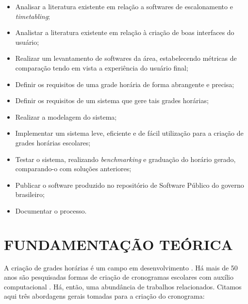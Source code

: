 \documentclass[12pt,a4paper]{article}
\begin{document}
			\begin{itemize}
				\item Analisar a literatura existente em relação a softwares de escalonamento e \textit{timetabling};
				\item Analistar a literatura existente em relação à criação de boas interfaces do usuário;
				\item Realizar um levantamento de softwares da área, estabelecendo métricas de comparação tendo em vista a experiência do usuário final;
				\item Definir os requisitos de uma grade horária de forma abrangente e precisa;
				\item Definir os requisitos de um sistema que gere tais grades horárias;
				\item Realizar a modelagem do sistema;
				\item Implementar um sistema leve, eficiente e de fácil utilização para a criação de grades horárias escolares;
				\item Testar o sistema, realizando \textit{benchmarking} e graduação do horário gerado, com\-pa\-ran\-do-o com soluções anteriores;
				\item Publicar o software produzido no repositório de Software Público do governo brasileiro;
				\item Documentar o processo.
			\end{itemize}

	\newpage


	\section{FUNDAMENTAÇÃO TEÓRICA}

		\par A criação de grades horárias é um campo em desenvolvimento \cite{patat2020}. Há mais de 50 anos são pesquisadas formas de criação de cronogramas escolares com auxílio computacional \cite{appleby}. Há, então, uma abundância de trabalhos relacionados. Citamos aqui três abordagens gerais tomadas para a criação do cronograma:
\end{document}
